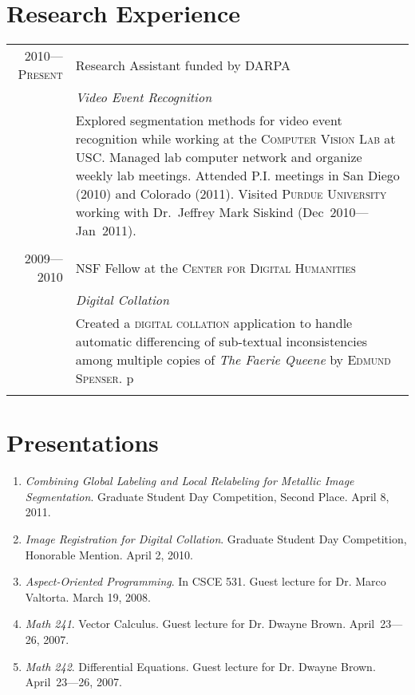 \documentclass[a4paper,10pt]{article}
\begin{document}
\section{Research Experience}
\begin{tabular}{r|p{11cm}}
\textsc{2010---Present}
& Research Assistant funded by \textsc{DARPA} \\
&\emph{Video Event Recognition}\\
&\footnotesize{Explored segmentation methods for video event recognition while working at the \textsc{Computer Vision Lab} at \textsc{USC}. Managed lab computer network and organize weekly lab meetings.  Attended P.I. meetings in San Diego (2010) and Colorado (2011). Visited \textsc{Purdue University} working with Dr.~Jeffrey Mark Siskind (Dec~2010---Jan~2011).}
\\\multicolumn{2}{c}{} \\
\textsc{2009---2010}
& NSF Fellow at the \textsc{Center for Digital Humanities} \\
&\emph{Digital Collation}\\
&\footnotesize{Created a \textsc{digital collation} application to handle automatic differencing of sub-textual inconsistencies among multiple copies of \emph{The Faerie Queene} by \textsc{Edmund Spenser}.}
p\\\multicolumn{2}{c}{} \\
\end{tabular}


\nocite{wang2011}
\nocite{temlyakov2010}
\nocite{zhang2010}
\renewcommand\refname{Publications}




\section{Presentations}
\begin{enumerate}
\renewcommand{\labelenumi}{[P\arabic{enumi}] }
\item \emph{Combining Global Labeling and Local Relabeling for Metallic Image Segmentation}. Graduate Student Day Competition, Second Place. April 8, 2011.
\item \emph{Image Registration for Digital Collation}. Graduate Student Day Competition, Honorable Mention. April 2, 2010.
\item \emph{Aspect-Oriented Programming}. In CSCE 531. Guest lecture for Dr. Marco Valtorta. March 19, 2008.
\item \emph{Math 241}. Vector Calculus. Guest lecture for Dr. Dwayne Brown. April~23---26, 2007. 
\item \emph{Math 242}. Differential Equations. Guest lecture for Dr. Dwayne Brown. April~23---26, 2007. 
\end{enumerate}
\end{document}
